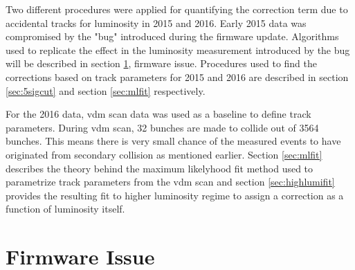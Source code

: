 Two different procedures were applied for quantifying the correction term due to accidental tracks for luminosity in 2015 and 2016. Early 2015 data was compromised by the "bug" introduced during the firmware update. Algorithms used to replicate the effect in the luminosity measurement introduced by the bug will be described in section \ref{sec:firmware}, firmware issue. Procedures used to find the corrections based on track parameters for 2015 and 2016 are described in section  \ref{sec:5sigcut} and section \ref{sec:mlfit} respectively.



For the 2016 data, vdm scan data was used as a baseline to define track parameters. During vdm scan, 32 bunches are made to collide out of 3564 bunches. This means there is very small chance of the measured events to have originated from secondary collision as mentioned earlier. Section \ref{sec:mlfit} describes the theory behind the maximum likelyhood fit method used to parametrize track parameters from the vdm scan and section \ref{sec:highlumifit} provides the resulting fit to higher luminosity regime to assign a correction as a function of luminosity itself.

\section{Firmware Issue} \label{sec:firmware}



